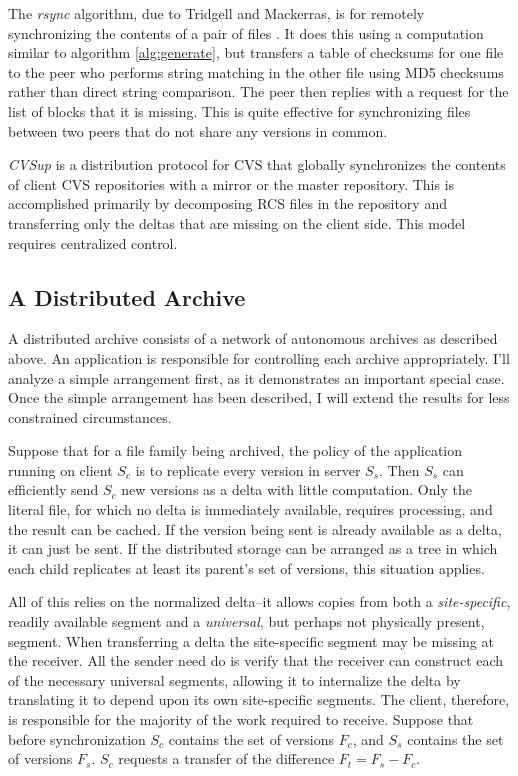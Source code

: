 \documentclass{llncs}
\begin{document}
The \emph{rsync} algorithm, due to Tridgell and Mackerras, is for
remotely synchronizing the contents of a pair of files \cite{Rsync}.
It does this using a computation similar to algorithm
\ref{alg:generate}, but transfers a table of checksums for one file to
the peer who performs string matching in the other file using MD5
checksums rather than direct string comparison.  The peer then replies
with a request for the list of blocks that it is missing.  This is
quite effective for synchronizing files between two peers that do not
share any versions in common.

\emph{CVSup} \cite{Polstra96} is a distribution protocol for CVS that
globally synchronizes the contents of client CVS repositories with a
mirror or the master repository.  This is accomplished primarily by
decomposing RCS files in the repository and transferring only the
deltas that are missing on the client side.  This model requires
centralized control.

\subsection{A Distributed Archive}

A distributed archive consists of a network of autonomous archives as
described above.  An application is responsible for controlling each
archive appropriately.  I'll analyze a simple arrangement first, as it
demonstrates an important special case.  Once the simple arrangement
has been described, I will extend the results for less constrained
circumstances.

Suppose that for a file family being archived, the policy of the
application running on client $S_c$ is to replicate every version in
server $S_s$.  Then $S_s$ can efficiently send $S_c$ new versions as a
delta with little computation.  Only the literal file, for which no
delta is immediately available, requires processing, and the result
can be cached.  If the version being sent is already available as a
delta, it can just be sent.  If the distributed storage can be
arranged as a tree in which each child replicates at least its
parent's set of versions, this situation applies.

All of this relies on the normalized delta--it allows copies from both
a \emph{site-specific}, readily available segment and a
\emph{universal}, but perhaps not physically present, segment.  When
transferring a delta the site-specific segment may be missing at the
receiver.  All the sender need do is verify that the receiver can
construct each of the necessary universal segments, allowing it to
internalize the delta by translating it to depend upon its own
site-specific segments.  The client, therefore, is responsible for the
majority of the work required to receive.  Suppose that before
synchronization $S_c$ contains the set of versions $F_c$, and $S_s$
contains the set of versions $F_s$.  $S_c$ requests a transfer of the
difference $F_t = F_s - F_c$.
\end{document}
